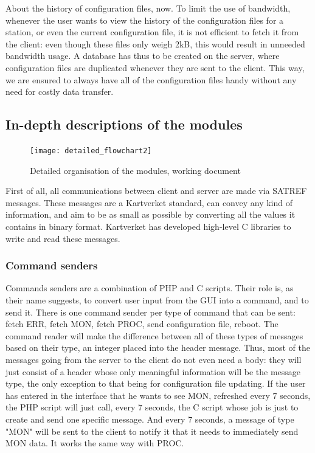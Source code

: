 \documentclass{themeensg}
\begin{document}
About the history of configuration files, now. To limit the use of bandwidth, whenever the user wants to view the history of the configuration files for a station, or even the current configuration file, it is not efficient to fetch it from the client: even though these files only weigh 2kB, this would result in unneeded bandwidth usage.
A database has thus to be created on the server, where configuration files are duplicated whenever they are sent to the client. This way, we are ensured to always have all of the configuration files handy without any need for costly data transfer.


\subsection{In-depth descriptions of the modules}

\begin{figure}[!ht]
	\centering
	\texttt{[image: detailed\_flowchart2]}
	\caption{Detailed organisation of the modules, working document}
\end{figure}

First of all, all communications between client and server are made via SATREF messages. These messages are a Kartverket standard, can convey any kind of information, and aim to be as small as possible by converting all the values it contains in binary format. Kartverket has developed high-level C libraries to write and read these messages.

\subsubsection{Command senders}

Commands senders are a combination of PHP and C scripts. Their role is, as their name suggests, to convert user input from the GUI into a command, and to send it. There is one command sender per type of command that can be sent: fetch ERR, fetch MON, fetch PROC, send configuration file, reboot. The command reader will make the difference between all of these types of messages based on their type, an integer placed into the header message. Thus, most of the messages going from the server to the client do not even need a body: they will just consist of a header whose only meaningful information will be the message type, the only exception to that being for configuration file updating.
If the user has entered in the interface that he wants to see MON, refreshed every 7 seconds, the PHP script will just call, every 7 seconds, the C script whose job is just to create and send one specific message. And every 7 seconds, a message of type "MON" will be sent to the client to notify it that it needs to immediately send MON data. It works the same way with PROC.
\end{document}

